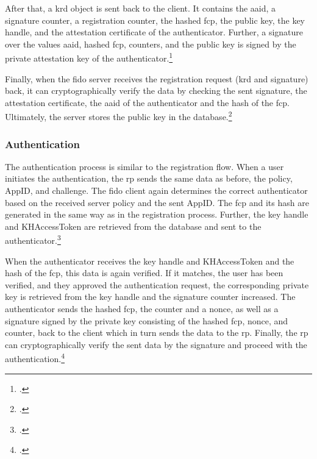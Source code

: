  After that, a \gls{krd} object is sent back to the client. It contains the \gls{aaid}, a signature counter, a registration counter, the hashed \gls{fcp}, the public key, the key handle, and the attestation certificate of the authenticator. Further, a signature over the values \gls{aaid}, hashed \gls{fcp}, counters, and the public key is signed by the private attestation key of the authenticator.\footcites[See][12--13]{analysis_fido_master_thesis}[See][22]{uaf-protocol}[See][17]{uaf-auth-commands}

Finally, when the \gls{fido} server receives the registration request (\gls{krd} and signature) back, it can cryptographically verify the data by checking the sent signature, the attestation certificate, the \gls{aaid} of the authenticator and the hash of the \gls{fcp}. Ultimately, the server stores the public key in the database.\footcites[See][192--193]{7897543}[See][23]{uaf-protocol}

\subsubsection{Authentication}

The authentication process is similar to the registration flow. When a user initiates the authentication, the \gls{rp} sends the same data as before, the policy, AppID, and challenge. The \gls{fido} client again determines the correct authenticator based on the received server policy and the sent AppID. The \gls{fcp} and its hash are generated in the same way as in the registration process. Further, the key handle and KHAccessToken are retrieved from the database and sent to the authenticator.\footcites[See][132--133]{10.1007/978-3-319-67639-5_11}

When the authenticator receives the key handle and KHAccessToken and the hash of the \gls{fcp}, this data is again verified. If it matches, the user has been verified, and they approved the authentication request, the corresponding private key is retrieved from the key handle and the signature counter increased. The authenticator sends the hashed \gls{fcp}, the counter and a \gls{nonce}, as well as a signature signed by the private key consisting of the hashed \gls{fcp}, nonce, and counter, back to the client which in turn sends the data to the \gls{rp}. Finally, the \gls{rp} can cryptographically verify the sent data by the signature and proceed with the authentication.\footcites[See][20--21]{uaf-auth-commands}[See][15]{analysis_fido_master_thesis}

